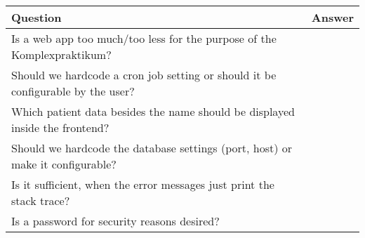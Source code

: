 \documentclass{scrreprt}
\begin{document}
\begin{tabular}{|L{4cm}|L{10cm}|}
	\hline
	\textbf{Question} & \textbf{Answer} \\
	\hline
	\hline
	Is a web app too much/too less for the purpose of the Komplexpraktikum? & \\
	\hline
	Should we hardcode a cron job setting or should it be configurable by the user? & \\
	\hline
	Which patient data besides the name should be displayed inside the frontend? & \\
	\hline
	Should we hardcode the database settings (port, host) or make it configurable? & \\ 
	\hline
	Is it sufficient, when the error messages just print the stack trace? & \\
	\hline
	Is a password for security reasons desired? & \\
	\hline

\end{tabular}
\end{document}
